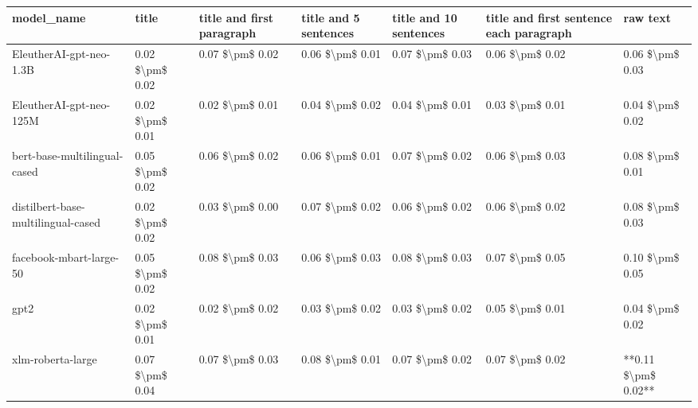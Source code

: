 \begin{tabular}{lllllll}
\toprule
                        model\_name &           title & title and first paragraph & title and 5 sentences & title and 10 sentences & title and first sentence each paragraph &            raw text \\
\midrule
           EleutherAI-gpt-neo-1.3B & 0.02 \$\textbackslash pm\$ 0.02 &           0.07 \$\textbackslash pm\$ 0.02 &       0.06 \$\textbackslash pm\$ 0.01 &        0.07 \$\textbackslash pm\$ 0.03 &                         0.06 \$\textbackslash pm\$ 0.02 &     0.06 \$\textbackslash pm\$ 0.03 \\
           EleutherAI-gpt-neo-125M & 0.02 \$\textbackslash pm\$ 0.01 &           0.02 \$\textbackslash pm\$ 0.01 &       0.04 \$\textbackslash pm\$ 0.02 &        0.04 \$\textbackslash pm\$ 0.01 &                         0.03 \$\textbackslash pm\$ 0.01 &     0.04 \$\textbackslash pm\$ 0.02 \\
      bert-base-multilingual-cased & 0.05 \$\textbackslash pm\$ 0.02 &           0.06 \$\textbackslash pm\$ 0.02 &       0.06 \$\textbackslash pm\$ 0.01 &        0.07 \$\textbackslash pm\$ 0.02 &                         0.06 \$\textbackslash pm\$ 0.03 &     0.08 \$\textbackslash pm\$ 0.01 \\
distilbert-base-multilingual-cased & 0.02 \$\textbackslash pm\$ 0.02 &           0.03 \$\textbackslash pm\$ 0.00 &       0.07 \$\textbackslash pm\$ 0.02 &        0.06 \$\textbackslash pm\$ 0.02 &                         0.06 \$\textbackslash pm\$ 0.02 &     0.08 \$\textbackslash pm\$ 0.03 \\
           facebook-mbart-large-50 & 0.05 \$\textbackslash pm\$ 0.02 &           0.08 \$\textbackslash pm\$ 0.03 &       0.06 \$\textbackslash pm\$ 0.03 &        0.08 \$\textbackslash pm\$ 0.03 &                         0.07 \$\textbackslash pm\$ 0.05 &     0.10 \$\textbackslash pm\$ 0.05 \\
                              gpt2 & 0.02 \$\textbackslash pm\$ 0.01 &           0.02 \$\textbackslash pm\$ 0.02 &       0.03 \$\textbackslash pm\$ 0.02 &        0.03 \$\textbackslash pm\$ 0.02 &                         0.05 \$\textbackslash pm\$ 0.01 &     0.04 \$\textbackslash pm\$ 0.02 \\
                 xlm-roberta-large & 0.07 \$\textbackslash pm\$ 0.04 &           0.07 \$\textbackslash pm\$ 0.03 &       0.08 \$\textbackslash pm\$ 0.01 &        0.07 \$\textbackslash pm\$ 0.02 &                         0.07 \$\textbackslash pm\$ 0.02 & **0.11 \$\textbackslash pm\$ 0.02** \\
\bottomrule
\end{tabular}
